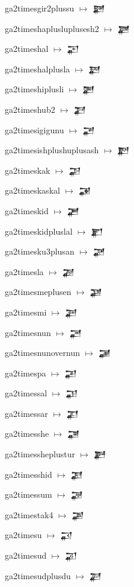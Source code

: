 {\noindent ga2timesgir2plussu $\mapsto$ {\cufont 𒃐}\par
\noindent ga2timeshaplusluplusesh2 $\mapsto$ {\cufont 𒃑}\par
\noindent ga2timeshal $\mapsto$ {\cufont 𒃒}\par
\noindent ga2timeshalplusla $\mapsto$ {\cufont 𒃓}\par
\noindent ga2timeshiplusli $\mapsto$ {\cufont 𒃔}\par
\noindent ga2timeshub2 $\mapsto$ {\cufont 𒃕}\par
\noindent ga2timesigigunu $\mapsto$ {\cufont 𒃖}\par
\noindent ga2timesishplushuplusash $\mapsto$ {\cufont 𒃗}\par
\noindent ga2timeskak $\mapsto$ {\cufont 𒃘}\par
\noindent ga2timeskaskal $\mapsto$ {\cufont 𒃙}\par
\noindent ga2timeskid $\mapsto$ {\cufont 𒃚}\par
\noindent ga2timeskidpluslal $\mapsto$ {\cufont 𒃛}\par
\noindent ga2timesku3plusan $\mapsto$ {\cufont 𒃜}\par
\noindent ga2timesla $\mapsto$ {\cufont 𒃝}\par
\noindent ga2timesmeplusen $\mapsto$ {\cufont 𒃞}\par
\noindent ga2timesmi $\mapsto$ {\cufont 𒃟}\par
\noindent ga2timesnun $\mapsto$ {\cufont 𒃠}\par
\noindent ga2timesnunovernun $\mapsto$ {\cufont 𒃡}\par
\noindent ga2timespa $\mapsto$ {\cufont 𒃢}\par
\noindent ga2timessal $\mapsto$ {\cufont 𒃣}\par
\noindent ga2timessar $\mapsto$ {\cufont 𒃤}\par
\noindent ga2timesshe $\mapsto$ {\cufont 𒃥}\par
\noindent ga2timessheplustur $\mapsto$ {\cufont 𒃦}\par
\noindent ga2timesshid $\mapsto$ {\cufont 𒃧}\par
\noindent ga2timessum $\mapsto$ {\cufont 𒃨}\par
\noindent ga2timestak4 $\mapsto$ {\cufont 𒃩}\par
\noindent ga2timesu $\mapsto$ {\cufont 𒃪}\par
\noindent ga2timesud $\mapsto$ {\cufont 𒃫}\par
\noindent ga2timesudplusdu $\mapsto$ {\cufont 𒃬}\par
}
